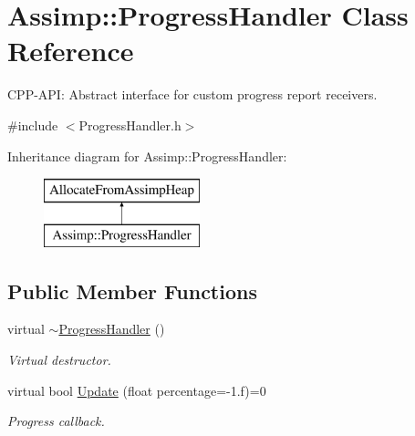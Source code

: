 \hypertarget{class_assimp_1_1_progress_handler}{\section{Assimp\-:\-:Progress\-Handler Class Reference}
\label{class_assimp_1_1_progress_handler}
}


C\-P\-P-\/\-A\-P\-I\-: Abstract interface for custom progress report receivers.  




{\ttfamily \#include $<$Progress\-Handler.\-h$>$}

Inheritance diagram for Assimp\-:\-:Progress\-Handler\-:\begin{figure}[H]
\begin{center}
\leavevmode
\includegraphics[height=2.000000cm]{class_assimp_1_1_progress_handler}
\end{center}
\end{figure}
\subsection*{Public Member Functions}
\begin{DoxyCompactItemize}
\item 
\hypertarget{class_assimp_1_1_progress_handler_a3ec465a62e1feaae00f585ca0cffb81e}{virtual \hyperlink{class_assimp_1_1_progress_handler_a3ec465a62e1feaae00f585ca0cffb81e}{$\sim$\-Progress\-Handler} ()}\label{class_assimp_1_1_progress_handler_a3ec465a62e1feaae00f585ca0cffb81e}

\begin{DoxyCompactList}\small\item\em Virtual destructor. \end{DoxyCompactList}\item 
virtual bool \hyperlink{class_assimp_1_1_progress_handler_ab08a1d300d434f6dd86ca41747cba448}{Update} (float percentage=-\/1.f)=0
\begin{DoxyCompactList}\small\item\em Progress callback. \end{DoxyCompactList}\end{DoxyCompactItemize}
